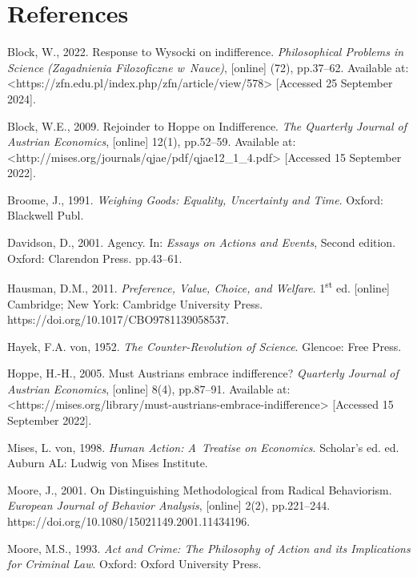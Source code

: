\section{References}

Block, W., 2022. Response to Wysocki on indifference. \textit{Philosophical Problems in Science (Zagadnienia Filozoficzne w~Nauce)}, [online] (72), pp.37–62. Available at: {\textless}https://zfn.edu.pl/index.php/zfn/article/view/578{\textgreater} [Accessed 25 September 2024].



Block, W.E., 2009. Rejoinder to Hoppe on Indifference. \textit{The Quarterly Journal of Austrian Economics}, [online] 12(1), pp.52–59. Available at: {\textless}http://mises.org/journals/qjae/pdf/qjae12\_1\_4.pdf{\textgreater} [Accessed 15 September 2022].



Broome, J., 1991. \textit{Weighing Goods: Equality, Uncertainty and Time}. Oxford: Blackwell Publ.



Davidson, D., 2001. Agency. In: \textit{Essays on Actions and Events}, Second edition. Oxford: Clarendon Press. pp.43–61.



Hausman, D.M., 2011. \textit{Preference, Value, Choice, and Welfare}. 1\textsuperscript{st} ed. [online] Cambridge; New York: Cambridge University Press. https://doi.org/10.1017/CBO9781139058537.



Hayek, F.A. von, 1952. \textit{The Counter-Revolution of Science}. Glencoe: Free Press.



Hoppe, H.-H., 2005. Must Austrians embrace indifference? \textit{Quarterly Journal of Austrian Economics}, [online] 8(4), pp.87–91. Available at: {\textless}https://mises.org/library/must-austrians-embrace-indifference{\textgreater} [Accessed 15 September 2022].



Mises, L. von, 1998. \textit{Human Action: A~Treatise on Economics}. Scholar's ed. ed. Auburn AL: Ludwig von Mises Institute.



Moore, J., 2001. On Distinguishing Methodological from Radical Behaviorism. \textit{European Journal of Behavior Analysis}, [online] 2(2), pp.221–244. https://doi.org/10.1080/15021149.2001.11434196.



Moore, M.S., 1993. \textit{Act and Crime: The Philosophy of Action and its Implications for Criminal Law}. Oxford: Oxford University Press.



